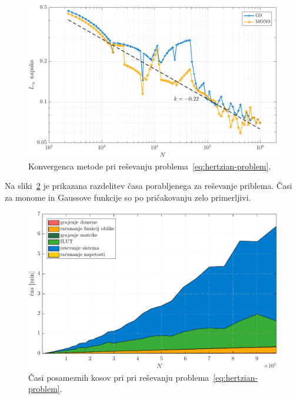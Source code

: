 \documentclass[12pt,a4paper,twoside]{article}
\theoremstyle{definition} %
\theoremstyle{plain} %
\numberwithin{equation}{section}
\newlength{\iw}
\begin{document}
\begin{figure}[h]
  \centering
  \includegraphics[width=\iw]{images/hertzian_convergence.pdf}
  \caption{Konvergenca metode pri reševanju problema~\eqref{eq:hertzian-problem}.}
  \label{fig:hertz-convergence}
\end{figure}

Na sliki~\ref{fig:hertz-time} je prikazana razdelitev časa porabljenega za reševanje priblema. Časi za monome in
Gaussove funkcije so po pričakovanju zelo primerljivi.

\begin{figure}[h]
  \centering
  \includegraphics[width=\iw]{images/hertzian_time.pdf}
  \caption{Časi posameznih kosov pri pri reševanju problema~\eqref{eq:hertzian-problem}.}
  \label{fig:hertz-time}
\end{figure}
\end{document}
